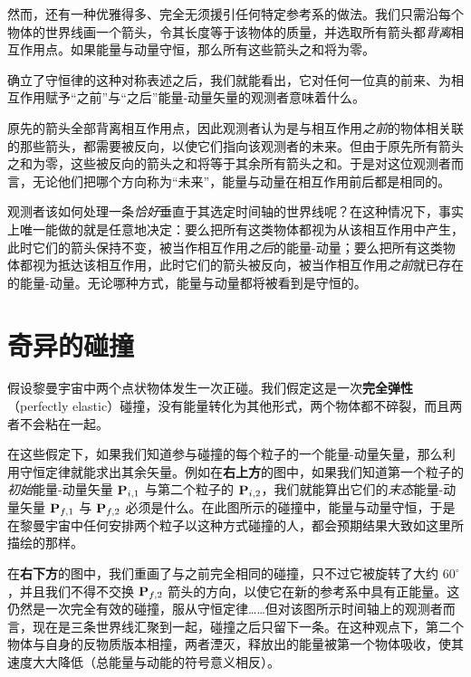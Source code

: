 
然而，还有一种优雅得多、完全无须援引任何特定参考系的做法。我们只需沿每个物体的世界线画一个箭头，令其长度等于该物体的质量，并选取所有箭头都\emph{背离}相互作用点。如果能量与动量守恒，那么所有这些箭头之和将为零。

确立了守恒律的这种对称表述之后，我们就能看出，它对任何一位真的前来、为相互作用赋予“之前”与“之后”能量-动量矢量的观测者意味着什么。


原先的箭头全部背离相互作用点，因此观测者认为是与相互作用\emph{之前}的物体相关联的那些箭头，都需要被反向，以使它们指向该观测者的未来。但由于原先所有箭头之和为零，这些被反向的箭头之和将等于其余所有箭头之和。于是对这位观测者而言，无论他们把哪个方向称为“未来”，能量与动量在相互作用前后都是相同的。

观测者该如何处理一条\emph{恰好}垂直于其选定时间轴的世界线呢？在这种情况下，事实上唯一能做的就是任意地决定：要么把所有这类物体都视为从该相互作用中产生，此时它们的箭头保持不变，被当作相互作用\emph{之后}的能量-动量；要么把所有这类物体都视为抵达该相互作用，此时它们的箭头被反向，被当作相互作用\emph{之前}就已存在的能量-动量。无论哪种方式，能量与动量都将被看到是守恒的。

\section{奇异的碰撞}



假设黎曼宇宙中两个点状物体发生一次正碰。我们假定这是一次\textbf{完全弹性}（perfectly elastic）碰撞，没有能量转化为其他形式，两个物体都不碎裂，而且两者不会粘在一起。

在这些假定下，如果我们知道参与碰撞的每个粒子的一个能量-动量矢量，那么利用守恒定律就能求出其余矢量。例如在\textbf{右上方}的图中，如果我们知道第一个粒子的\emph{初始}能量-动量矢量 $\mathbf{P}_{i,1}$ 与第二个粒子的 $\mathbf{P}_{i,2}$，我们就能算出它们的\emph{末态}能量-动量矢量 $\mathbf{P}_{f,1}$ 与 $\mathbf{P}_{f,2}$ 必须是什么。在此图所示的碰撞中，能量与动量守恒，于是在黎曼宇宙中任何安排两个粒子以这种方式碰撞的人，都会预期结果大致如这里所描绘的那样。

在\textbf{右下方}的图中，我们重画了与之前完全相同的碰撞，只不过它被旋转了大约 $60^\circ$，并且我们不得不交换 $\mathbf{P}_{f,2}$ 箭头的方向，以使它在新的参考系中具有正能量。这仍然是一次完全有效的碰撞，服从守恒定律……但对该图所示时间轴上的观测者而言，现在是三条世界线汇聚到一起，碰撞之后只留下一条。在这种观点下，第二个物体与自身的反物质版本相撞，两者湮灭，释放出的能量被第一个物体吸收，使其速度大大降低（总能量与动能的符号意义相反）。

